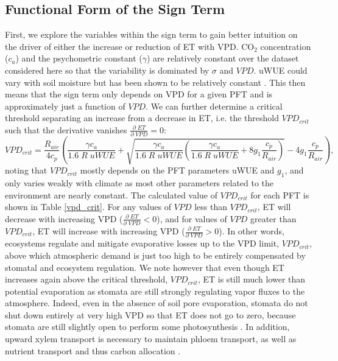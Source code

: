 \subsection{Functional Form of the Sign Term}
\label{sign_term}
First, we explore the variables within the sign term to gain better
intuition on the driver of either the increase or reduction of ET with
VPD. CO$_2$ concentration ($c_a$) and the psychometric constant
($\gamma$) are relatively constant over the dataset considered here so
that the variability is dominated by $\sigma$ and $VPD$. uWUE could
vary with soil moisture but has been shown to be relatively constant
\citep{Zhou_2015}. This then means that the sign term only depends on
VPD for a given PFT and is approximately just a function of $VPD$. We
can further determine a critical threshold separating an increase from
a decrease in ET, i.e. the threshold $VPD_{crit}$ such that the
derivative vanishes $\frac{\partial \; ET}{\partial \; VPD} = 0$:
\small
  \begin{equation}
    VPD_{crit} = \frac{R_{air}}{4 c_p} \left( \frac{\gamma c_a}{1.6\; R \;  uWUE} + \sqrt{\frac{\gamma c_a}{1.6\; R \;  uWUE}\left( \frac{\gamma c_a}{1.6\; R \;  uWUE} + 8 g_1 \frac{c_p}{R_{air}}\right)} - 4 g_1 \frac{c_p}{R_{air}} \right),
    \label{vpd_min_et}
  \end{equation}
\normalsize noting that $VPD_{crit}$ mostly depends on the PFT
parameters uWUE and $g_1$, and only varies weakly with climate as most
other parameters related to the environment are nearly constant. The
calculated value of $VPD_{crit}$ for each PFT is shown in Table
\ref{vpd_crit}. For any values of $VPD$ less than $VPD_{crit}$, ET
will decrease with increasing VPD
($\frac{\partial \; ET}{\partial \; VPD} < 0$), and for values of
$VPD$ greater than $VPD_{crit}$, ET will increase with increasing VPD
($\frac{\partial \; ET}{\partial \; VPD} > 0$). In other words,
ecosystems regulate and mitigate evaporative losses up to the VPD
limit, $VPD_{crit}$, above which atmospheric demand is just too high
to be entirely compensated by stomatal and ecosystem regulation. We
note however that even though ET increases again above the critical
threshold, $VPD_{crit}$, ET is still much lower than potential
evaporation as stomata are still strongly regulating vapor fluxes to
the atmosphere. Indeed, even in the absence of soil pore evaporation,
stomata do not shut down entirely at very high VPD so that ET does not
go to zero, because stomata are still slightly open to perform some
photosynthesis \citep{Ball_1987, Leuning_1990, MEDLYN_2011}. In
addition, upward xylem transport is necessary to maintain phloem
transport, as well as nutrient transport and thus carbon allocation
\citep{De_2013, Nikinmaa_2013, Ryan_2014}.

